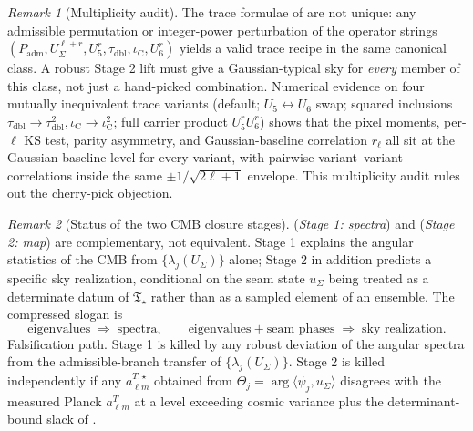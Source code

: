 \documentclass[11pt,a4paper]{article}
\theoremstyle{definition}
\theoremstyle{remark}
\newtheorem*{remark}{Remark}
\newcommand{\taudbl}{\tau_{\mathrm{dbl}}}
\newcommand{\iC}{\iota_{\mathrm C}}
\newcommand{\Padm}{P_{\mathrm{adm}}}
\newcommand{\Tstar}{\mathfrak T_{\star}}
\begin{document}
\begin{remark}[Multiplicity audit]
\label{rem:multiplicity-audit}
The trace formulae of  are not unique: any admissible
permutation or integer-power perturbation of the operator strings
$(\Padm,U_\Sigma^{\ell+r},U_5^{r},\taudbl,\iC,U_6^{r})$ yields a valid trace recipe in the same
canonical class. A robust Stage 2 lift must give a Gaussian-typical sky for \emph{every} member of
this class, not just a hand-picked combination. Numerical evidence on four mutually inequivalent
trace variants (default; $U_5\leftrightarrow U_6$ swap; squared inclusions
$\taudbl\to\taudbl^2,\iC\to\iC^2$; full carrier product $U_5^rU_6^r$) shows that the pixel
moments, per-$\ell$ KS test, parity asymmetry, and Gaussian-baseline correlation $r_\ell$ all sit
at the Gaussian-baseline level for every variant, with pairwise variant–variant correlations
inside the same $\pm1/\sqrt{2\ell+1}$ envelope. This multiplicity audit rules out the cherry-pick
objection.
\end{remark}

\begin{remark}[Status of the two CMB closure stages]
 (\emph{Stage 1: spectra}) and
 (\emph{Stage 2: map}) are complementary, not equivalent.
Stage 1 explains the angular statistics of the CMB from $\{\lambda_j(U_\Sigma)\}$ alone; Stage 2 in
addition predicts a specific sky realization, conditional on the seam state $u_\Sigma$ being treated
as a determinate datum of $\Tstar$ rather than as a sampled element of an ensemble. The compressed
slogan is
\[
\text{eigenvalues}\;\Rightarrow\;\text{spectra},\qquad
\text{eigenvalues}+\text{seam phases}\;\Rightarrow\;\text{sky realization.}
\]
Falsification path. Stage 1 is killed by any robust deviation of the angular spectra from the
admissible-branch transfer of $\{\lambda_j(U_\Sigma)\}$. Stage 2 is killed independently if any
$a_{\ell m}^{T,\star}$ obtained from $\Theta_j=\arg\langle\psi_j,u_\Sigma\rangle$ disagrees with the
measured Planck $a_{\ell m}^T$ at a level exceeding cosmic variance plus the determinant-bound
slack of .
\end{remark}
\end{document}
